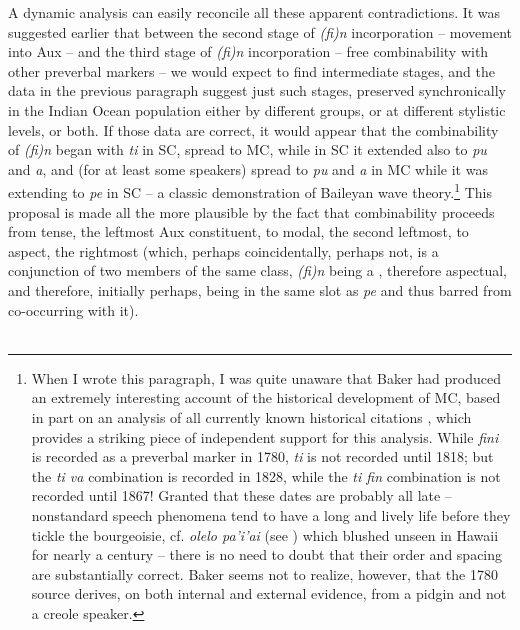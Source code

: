A dynamic analysis can easily reconcile all these apparent contradictions. It was suggested earlier that between the second stage of \textit{(fi)n} incorporation -- movement into Aux -- and the third stage of \textit{(fi)n} incorporation -- free combinability with other preverbal markers -- we would expect to find intermediate stages, and the data in the previous paragraph suggest just such stages, preserved synchronically in the Indian Ocean population either by different groups, or at different stylistic levels, or both. If those data are correct, it would appear that the combinability of \textit{(fi)n} began with \textit{ti} in SC, spread to MC, while in SC it extended also to \textit{pu} and \textit{a}, and (for at least some speakers) spread to \textit{pu} and \textit{a} in MC while it was extending to \textit{pe} in SC -- a classic demonstration of Baileyan wave theory.\footnote{When I wrote this paragraph, I was quite unaware that Baker had produced an extremely interesting account of the historical de\-velopment of MC, based in part on an analysis of all currently known historical citations \citep{Baker1976}, which provides a striking piece of independent support for this analysis. While \textit{fini} is recorded as a pre\-verbal marker in 1780, \textit{ti} is not recorded until 1818; but the \textit{ti va} combination is recorded in 1828, while the \textit{ti fin} combination is not recorded until 1867! Granted that these dates are probably all late -- nonstandard speech phenomena tend to have a long and lively life before they tickle the bourgeoisie, cf. \textit{olelo pa'i'ai} (see ) which blushed unseen in Hawaii for nearly a century -- there is no need to doubt that their order and spacing are substantially correct. Baker seems not to realize, however, that the 1780 source derives, on both internal and external evidence, from a pidgin and not a creole speaker.} This proposal is made all the more plausible by the fact that combinability proceeds from tense, the leftmost Aux constituent, to modal, the second leftmost, to aspect, the rightmost (which, perhaps coincidentally, perhaps
not, is a conjunction of two members of the same class, \textit{(fi)n} being a , therefore aspectual, and therefore, initially perhaps, being in the same slot as \textit{pe} and thus barred from co-occurring with it).\\\\

